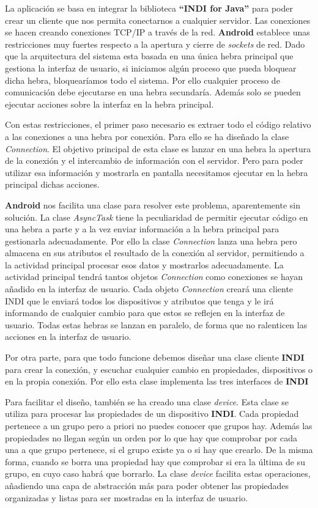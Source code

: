 La aplicación se basa en integrar la biblioteca \textbf{``INDI for Java''} para poder crear un cliente que nos permita conectarnos a cualquier servidor. Las conexiones se hacen creando conexiones TCP/IP a través de la red. \textbf{Android} establece unas restricciones muy fuertes respecto a la apertura y cierre de \textit{sockets} de red. Dado que la arquitectura del sistema esta basada en una única hebra principal que gestiona la interfaz de usuario, si iniciamos algún proceso que pueda bloquear dicha hebra, bloquearíamos todo el sistema. Por ello cualquier proceso de comunicación debe ejecutarse en una hebra secundaría. Además solo se pueden ejecutar acciones sobre la interfaz en la hebra principal.

\bigskip
Con estas restricciones, el primer paso necesario es extraer todo el código relativo a las conexiones a una hebra por conexión. Para ello se ha diseñado la clase \textit{Connection}. El objetivo principal de esta clase es lanzar en una hebra la apertura de la conexión y el intercambio de información con el servidor. Pero para poder utilizar esa información y mostrarla en pantalla necesitamos ejecutar en la hebra principal dichas acciones. 

\bigskip
\textbf{Android} nos facilita una clase para resolver este problema, aparentemente sin solución. La clase \textit{AsyncTask} tiene la peculiaridad de permitir ejecutar código en una hebra a parte y a la vez enviar información a la hebra principal para gestionarla adecuadamente. Por ello la clase \textit{Connection} lanza una hebra pero almacena en sus atributos el resultado de la conexión al servidor, permitiendo a la actividad principal procesar esos datos y mostrarlos adecuadamente. La actividad principal tendrá tantos objetos \textit{Connection} como conexiones se hayan añadido en la interfaz de usuario. Cada objeto \textit{Connection} creará una cliente INDI que le enviará todos los dispositivos y atributos que tenga y le irá informando de cualquier cambio para que estos se reflejen en la interfaz de usuario. Todas estas hebras se lanzan en paralelo, de forma que no ralenticen las acciones en la interfaz de usuario.

\bigskip
Por otra parte, para que todo funcione debemos diseñar una clase cliente \textbf{INDI} para crear la conexión, y escuchar cualquier cambio en propiedades, dispositivos o en la propia conexión. Por ello esta clase implementa las tres interfaces de \textbf{INDI}

\bigskip
Para facilitar el diseño, también se ha creado una clase \textit{device}. Esta clase se utiliza para procesar las propiedades de un dispositivo \textbf{INDI}. Cada propiedad pertenece a un grupo pero a priori no puedes conocer que grupos hay. Además las propiedades no llegan según un orden por lo que hay que comprobar por cada una a que grupo pertenece, si el grupo existe ya o si hay que crearlo. De la misma forma, cuando se borra una propiedad hay que comprobar si era la última de su grupo, en cuyo caso habrá que borrarlo. La clase \textit{device} facilita estas operaciones, añadiendo una capa de abstracción más para poder obtener las propiedades organizadas y listas para ser mostradas en la interfaz de usuario.


